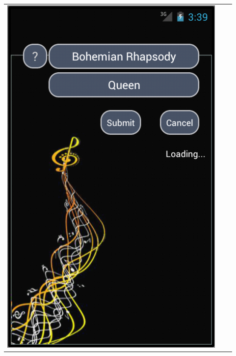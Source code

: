 \documentclass[11pt,a4paper]{article}
\begin{document}
\begin{tabular}{l l l}
	\includegraphics[scale=0.4]{GUI_0124_startsearch.png} &

\end{tabular}
\end{document}
